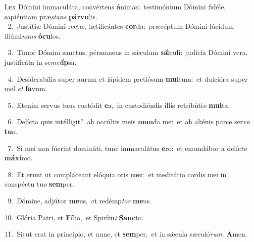 \lettrine{\initial\textcolor{\initialcolor}{L}}{ex} Dómini immaculáta, convértens \textbf{á}\-nimas:~\star testimónium Dómini fidéle, sapiéntiam præ\textit{stans} \textbf{pár}\-\textbf{vu}lis.\\
{\numbfont\textcolor{\numbcolor}{~2.}}~Justítiæ Dómini rectæ, lætificántes \textbf{cor}\-da:~\star præcéptum Dómini lúcidum illúmi\textit{nans} \textbf{ó}\-\textbf{cu}los.\par
{\numbfont\textcolor{\numbcolor}{~3.}}~Timor Dómini sanctus, pérmanens in sǽculum \textbf{sǽ}\-culi:~\star judícia Dómini vera, justificáta in se\-\textit{met}\-\textbf{íp}sa.\par
{\numbfont\textcolor{\numbcolor}{~4.}}~Desiderabília super aurum et lápidem pretiósum \textbf{mul}\-tum:~\star et dulcióra super mel \textit{et} \textbf{fa}\-vum.\par
{\numbfont\textcolor{\numbcolor}{~5.}}~Etenim servus tuus custódit \textbf{e}\-a,~\star in custodiéndis illis retribúti\textit{o} \textbf{mul}\-ta.\par
{\numbfont\textcolor{\numbcolor}{~6.}}~Delícta quis intélligit?~\dagger ab occúltis meis \textbf{mun}\-da me:~\star et ab aliénis parce ser\textit{vo} \textbf{tu}\-o.\par
{\numbfont\textcolor{\numbcolor}{~7.}}~Si mei non fúerint domináti, tunc immaculátus \textbf{e}\-ro:~\star et emundábor a delíc\textit{to} \textbf{má}\-\textbf{xi}mo.\par
{\numbfont\textcolor{\numbcolor}{~8.}}~Et erunt ut compláceant elóquia oris \textbf{me}\-i:~\star et meditátio cordis mei in conspéctu tu\textit{o} \textbf{sem}\-per.\par
{\numbfont\textcolor{\numbcolor}{~9.}}~Dómine, adjútor \textbf{me}\-us,~\star et redémp\textit{tor} \textbf{me}\-us.\par
{\numbfont\textcolor{\numbcolor}{10.}}~Glória Patri, et \textbf{Fí}\-lio,~\star et Spirítu\textit{i} \textbf{Sanc}\-to.\par
{\numbfont\textcolor{\numbcolor}{11.}}~Sicut erat in princípio, et nunc, et \textbf{sem}\-per,~\star et in sǽcula sæculó\-\textit{rum}\-. \textbf{A}\-men.\par
